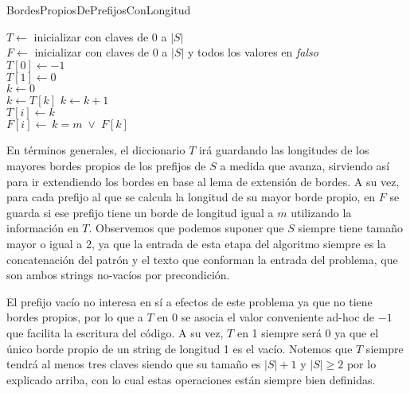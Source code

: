 \bigskip

\begin{algorithm}[H]
	\caption{BordesPropiosDePrefijosConLongitud}

	$T \gets$ inicializar con claves de 0 a $|S|$ \\
	$F \gets$ inicializar con claves de 0 a $|S|$ y todos los valores en \textit{falso} \\
	$T [0] \gets -1$ \\
	$T [1] \gets 0$ \\
	$k \gets 0$ \\
	
     {
	 {
		$k \gets T[k]$
    	}
	$k \gets k+1$ \\
	$T[i] \gets k$ \\
	$F[i] \gets \: k = m \; \vee \; F[k]$
}

\end{algorithm}

\bigskip

En términos generales, el diccionario $T$ irá guardando las longitudes de los mayores bordes propios de los prefijos de $S$ a medida que avanza, sirviendo así para ir extendiendo los bordes en base al lema de extensión de bordes. A su vez, para cada prefijo al que se calcula la longitud de su mayor borde propio, en $F$ se guarda si ese prefijo tiene un borde de longitud igual a $m$ utilizando la información en $T$. Observemos que podemos suponer que $S$ siempre tiene tamaño mayor o igual a 2, ya que la entrada de esta etapa del algoritmo siempre es la concatenación del patrón y el texto que conforman la entrada del problema, que son ambos strings no-vacíos por precondición. 

\medskip

El prefijo vacío no interesa en sí a efectos de este problema ya que no tiene bordes propios, por lo que a $T$ en 0 se asocia el valor conveniente ad-hoc de $-1$ que facilita la escritura del código. A su vez, $T$ en 1 siempre será 0 ya que el único borde propio de un string de longitud 1 es el vacío. Notemos que $T$ siempre tendrá al menos tres claves siendo que su tamaño es $|S|+1$ y $|S| \geq 2$ por lo explicado arriba, con lo cual estas operaciones están siempre bien definidas.

\medskip

